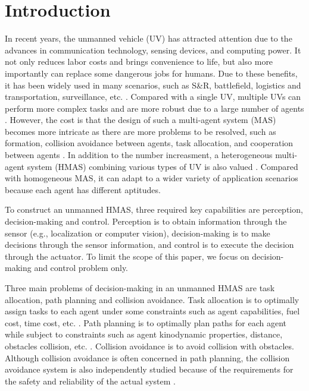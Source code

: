 \documentclass[journal,12pt,onecolumn,draftclsnofoot,]{IEEEtran}
\begin{document}
\maketitle

\section{Introduction}
In recent years, the unmanned vehicle (UV) has attracted attention due to the advances in communication technology, sensing devices, and computing power. It not only reduces labor costs and brings convenience to life, but also more importantly can replace some dangerous jobs for humans. Due to these benefits, it has been widely used in many scenarios, such as S\&R, battlefield, logistics and transportation, surveillance, etc. \cite{9700861}. Compared with a single UV, multiple UVs can perform more complex tasks and are more robust due to a large number of agents \cite{8352646}. However, the cost is that the design of such a multi-agent system (MAS) becomes more intricate as there are more problems to be resolved, such as formation, collision avoidance between agents, task allocation, and cooperation between agents \cite{chen2019control}. In addition to the number increasment, a heterogeneous multi-agent system (HMAS) combining various types of UV is also valued \cite{9371292}. Compared with homogeneous MAS, it can adapt to a wider variety of application scenarios because each agent has different aptitudes.

To construct an unmanned HMAS, three required key capabilities are perception, decision-making and control. Perception is to obtain information through the sensor (e.g., localization or computer vision), decision-making is to make decisions through the sensor information, and control is to execute the decision through the actuator. To limit the scope of this paper, we focus on decision-making and control problem only.

Three main problems of decision-making in an unmanned HMAS are task allocation, path planning and collision avoidance. Task allocation is to optimally assign tasks to each agent under some constraints such as agent capabilities, fuel cost, time cost, etc. \cite{skaltsis2021survey}. Path planning is to optimally plan paths for each agent while subject to constraints such as agent kinodynamic properties, distance, obstacles collision, etc. \cite{zhang2018path}. Collision avoidance is to avoid collision with obstacles. Although collision avoidance is often concerned in path planning, the collision avoidance system is also independently studied because of the requirements for the safety and reliability of the actual system \cite{9108245}.
\end{document}
